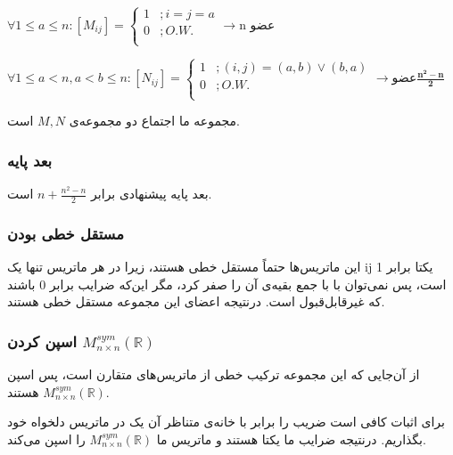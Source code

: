 \setLTR
$
\forall
 1\leq a	\leq n : [M_{ij}]=\begin{cases}
	1 & ;  i = j =a \\
	0 & ;  O.W. \\
\end{cases} \longrightarrow \text{n عضو}
$

$
\forall 1\leq a < n , a < b \leq n: [N_{ij}]=\begin{cases}
	1 & ; (i,j)=(a,b)\lor(b,a) \\
	0 & ; O.W.\\
\end{cases} \longrightarrow \text{عضو} \boldsymbol{\frac{n^2-n}{2}}
$
\setRTL

مجموعه ما اجتماع دو مجموعه‌ی
$M , N$
است.

\subsubsection*{بعد پایه}

بعد پایه پیشنهادی برابر 
$n + \frac{n^2-n}{2}$
است.

\subsubsection*{مستقل خطی بودن}

 این ماتریس‌ها حتماً مستقل خطی هستند، زیرا در هر ماتریس تنها یک ij یکتا برابر 1 است، پس نمی‌توان با با جمع بقیه‌ی آن را صفر کرد، مگر این‌که ضرایب برابر 0 باشند که غیرقابل‌قبول است. درنتیجه اعضای این مجموعه مستقل خطی هستند.
 
 \subsubsection*{اسپن کردن $M^{sym}_{n \times n}(\mathbb{R})$} 
 
 از آن‌جایی که این مجموعه ترکیب خطی از ماتریس‌های متقارن است، پس اسپن 
 $M^{sym}_{n \times n}(\mathbb{R})$
 هستند.
 
 برای اثبات کافی است ضریب را برابر با خانه‌ی متناظر آن یک در ماتریس دلخواه خود بگذاریم. درنتیجه ضرایب ما یکتا هستند و ماتریس ما
  $M^{sym}_{n \times n}(\mathbb{R})$
   را اسپن می‌کند.
 
 
 
 
 
 
 
 
 
 
 
 
 
